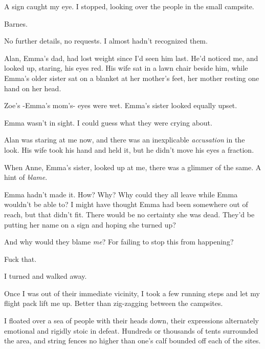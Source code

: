 A sign caught my eye.  I stopped, looking over the people in the small campsite.



Barnes.



No further details, no requests.  I almost hadn't recognized them.



Alan, Emma's dad, had lost weight since I'd seen him last.  He'd noticed me, and looked up, staring, his eyes red.  His wife sat in a lawn chair beside him, while Emma's older sister sat on a blanket at her mother's feet, her mother resting one hand on her head.



Zoe's -Emma's mom's- eyes were wet.  Emma's sister looked equally upset.



Emma wasn't in sight.  I could guess what they were crying about.



Alan was staring at me now, and there was an inexplicable \emph{accusation }in the look.  His wife took his hand and held it, but he didn't move his eyes a fraction.



When Anne, Emma's sister, looked up at me, there was a glimmer of the same.  A hint of \emph{blame}.



Emma hadn't made it.  How?  Why?  Why could they all leave while Emma wouldn't be able to?  I might have thought Emma had been somewhere out of reach, but that didn't fit.  There would be no certainty she was dead.  They'd be putting her name on a sign and hoping she turned up?



And why would they blame \emph{me}?  For failing to stop this from happening?



Fuck that.



I turned and walked away.



Once I was out of their immediate vicinity, I took a few running steps and let my flight pack lift me up.  Better than zig-zagging between the campsites.



I floated over a sea of people with their heads down, their expressions alternately emotional and rigidly stoic in defeat.  Hundreds or thousands of tents surrounded the area, and string fences no higher than one's calf bounded off each of the sites.



